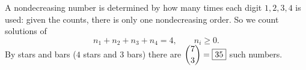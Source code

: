 A nondecreasing number is determined by how many times each digit $1,2,3,4$ is used: given the counts, there is only one nondecreasing order. So we count solutions of
\[
n_1+n_2+n_3+n_4=4,\qquad n_i\ge0 .
\]
By stars and bars ($4$ stars and $3$ bars) there are $\dbinom{7}{3}=\boxed{35}$ such numbers.
